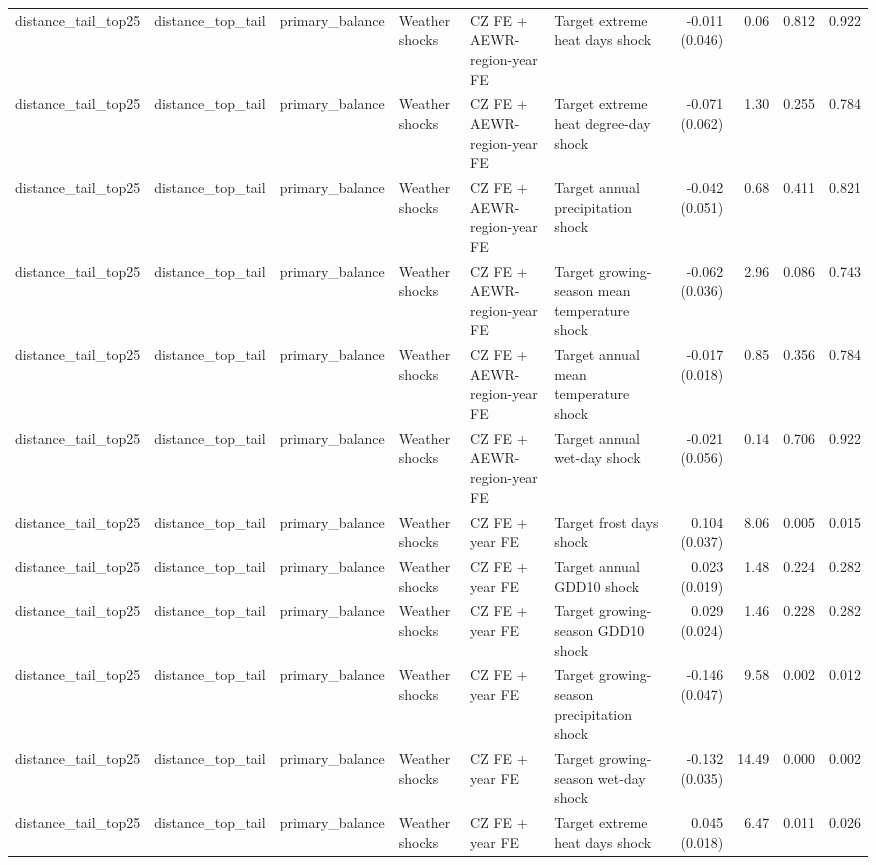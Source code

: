 \begin{tabular}{llllllrrrr}
distance_tail_top25 & distance_top_tail & primary_balance & Weather shocks & CZ FE + AEWR-region-year FE & Target extreme heat days shock & -0.011 (0.046) & 0.06 & 0.812 & 0.922 \\
distance_tail_top25 & distance_top_tail & primary_balance & Weather shocks & CZ FE + AEWR-region-year FE & Target extreme heat degree-day shock & -0.071 (0.062) & 1.30 & 0.255 & 0.784 \\
distance_tail_top25 & distance_top_tail & primary_balance & Weather shocks & CZ FE + AEWR-region-year FE & Target annual precipitation shock & -0.042 (0.051) & 0.68 & 0.411 & 0.821 \\
distance_tail_top25 & distance_top_tail & primary_balance & Weather shocks & CZ FE + AEWR-region-year FE & Target growing-season mean temperature shock & -0.062 (0.036) & 2.96 & 0.086 & 0.743 \\
distance_tail_top25 & distance_top_tail & primary_balance & Weather shocks & CZ FE + AEWR-region-year FE & Target annual mean temperature shock & -0.017 (0.018) & 0.85 & 0.356 & 0.784 \\
distance_tail_top25 & distance_top_tail & primary_balance & Weather shocks & CZ FE + AEWR-region-year FE & Target annual wet-day shock & -0.021 (0.056) & 0.14 & 0.706 & 0.922 \\
distance_tail_top25 & distance_top_tail & primary_balance & Weather shocks & CZ FE + year FE & Target frost days shock & 0.104 (0.037) & 8.06 & 0.005 & 0.015 \\
distance_tail_top25 & distance_top_tail & primary_balance & Weather shocks & CZ FE + year FE & Target annual GDD10 shock & 0.023 (0.019) & 1.48 & 0.224 & 0.282 \\
distance_tail_top25 & distance_top_tail & primary_balance & Weather shocks & CZ FE + year FE & Target growing-season GDD10 shock & 0.029 (0.024) & 1.46 & 0.228 & 0.282 \\
distance_tail_top25 & distance_top_tail & primary_balance & Weather shocks & CZ FE + year FE & Target growing-season precipitation shock & -0.146 (0.047) & 9.58 & 0.002 & 0.012 \\
distance_tail_top25 & distance_top_tail & primary_balance & Weather shocks & CZ FE + year FE & Target growing-season wet-day shock & -0.132 (0.035) & 14.49 & 0.000 & 0.002 \\
distance_tail_top25 & distance_top_tail & primary_balance & Weather shocks & CZ FE + year FE & Target extreme heat days shock & 0.045 (0.018) & 6.47 & 0.011 & 0.026 \\

\end{tabular}
